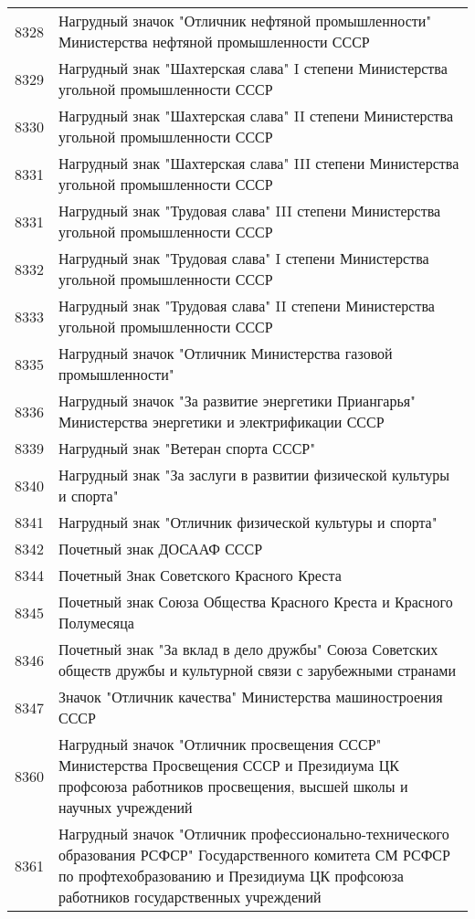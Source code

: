\documentclass[10pt, a4paper, titlepage]{article}
\begin{document}
\begin{center}
\begin{longtable}{rp{}}
        8328 & Нагрудный значок "Отличник нефтяной промышленности" Министерства нефтяной промышленности СССР \\
        8329 & Нагрудный знак "Шахтерская слава" I степени Министерства угольной промышленности СССР \\
        8330 & Нагрудный знак "Шахтерская слава" II степени Министерства угольной промышленности СССР \\
        8331 & Нагрудный знак "Шахтерская слава" III степени Министерства угольной промышленности СССР \\
        8331 & Нагрудный знак "Трудовая слава" III степени Министерства угольной промышленности СССР \\
        8332 & Нагрудный знак "Трудовая слава" I степени Министерства угольной промышленности СССР \\
        8333 & Нагрудный знак "Трудовая слава" II степени Министерства угольной промышленности СССР \\
        8335 & Нагрудный значок "Отличник Министерства газовой промышленности" \\
        8336 & Нагрудный значок "За развитие энергетики Приангарья" Министерства энергетики и электрификации СССР \\
        8339 & Нагрудный знак "Ветеран спорта СССР" \\
        8340 & Нагрудный знак "За заслуги в развитии физической культуры и спорта" \\
        8341 & Нагрудный знак "Отличник физической культуры и спорта" \\
        8342 & Почетный знак ДОСААФ СССР \\
        8344 & Почетный Знак Советского Красного Креста \\
        8345 & Почетный знак Союза Общества Красного Креста и Красного Полумесяца \\
        8346 & Почетный знак "За вклад в дело дружбы" Союза Советских обществ дружбы и культурной связи с зарубежными странами \\
        8347 & Значок "Отличник качества" Министерства машиностроения СССР \\
        8360 & Нагрудный значок "Отличник просвещения СССР" Министерства Просвещения СССР и Президиума ЦК профсоюза работников просвещения, высшей школы и научных учреждений \\
        8361 & Нагрудный значок "Отличник профессионально-технического образования РСФСР" Государственного комитета СМ РСФСР по профтехобразованию и Президиума ЦК профсоюза работников государственных учреждений \\

\end{longtable}
\end{center}
\end{document}

